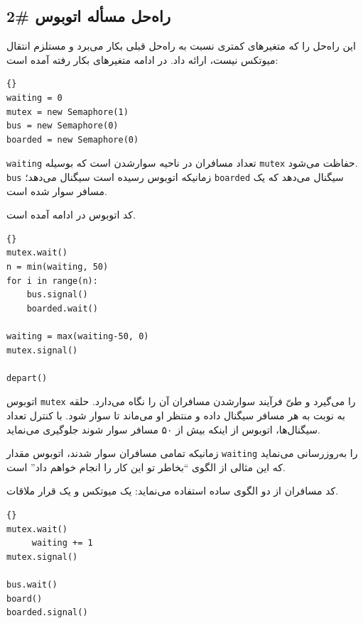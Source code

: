 \documentclass{book}
\newcommand{\clearemptydoublepage}{}%
\begin{document}
\clearemptydoublepage
\subsection {راه‌حل مسأله اتوبوس \#2}

    این راه‌حل را که متغیرهای کمتری نسبت به راه‌حل قبلی بکار می‌برد و  مستلزم انتقال میوتکس نیست،  ارائه داد. در ادامه متغیرهای بکار رفته آمده است:

\begin{latin}
\begin{lstlisting}[title=\rl{راه‌حل \#2 مسأله اتوبوس  (مقداردهی اولیه)}]{}
waiting = 0
mutex = new Semaphore(1)
bus = new Semaphore(0)
boarded = new Semaphore(0)
\end{lstlisting}
\end{latin}

    {\tt waiting} 
    تعداد مسافران در ناحیه سوارشدن است که بوسیله {\tt mutex} حفاظت می‌شود.  {\tt bus} زمانیکه اتوبوس رسیده است سیگنال می‌دهد؛     {\tt boarded} 
    سیگنال می‌دهد که یک مسافر سوار شده است. 

    کد اتوبوس در ادامه آمده است. 

\begin{latin}
\begin{lstlisting}[title=\rl{راه‌حل اتوبوس (اتوبوس)}]{}
mutex.wait()
n = min(waiting, 50)
for i in range(n):
    bus.signal()
    boarded.wait()

waiting = max(waiting-50, 0)
mutex.signal()

depart()
\end{lstlisting}
\end{latin}

    اتوبوس {\tt mutex}  را می‌گیرد و طیّ فرآیند سوارشدن مسافران آن را نگاه می‌دارد. 
    حلقه به نوبت به هر مسافر  سیگنال داده  و منتظر او می‌ماند تا سوار شود. 
    با کنترل تعداد سیگنال‌ها، اتوبوس از اینکه بیش از ۵۰ مسافر سوار شوند جلوگیری می‌نماید. 

    زمانیکه تمامی مسافران سوار شدند، اتوبوس مقدار  {\tt waiting} را به‌روزرسانی می‌نماید که این مثالی از الگوی ``بخاطر تو  این کار را انجام خواهم داد'' است. 

    کد مسافران از دو الگوی ساده استفاده می‌نماید: یک میوتکس و یک قرار ملاقات. 

\begin{latin}
\begin{lstlisting}[title=\rl{راه‌حل اتوبوس (مسافران)}]{}
mutex.wait()
     waiting += 1
mutex.signal()

bus.wait()
board()
boarded.signal()
\end{lstlisting}
\end{latin}
\end{document}

